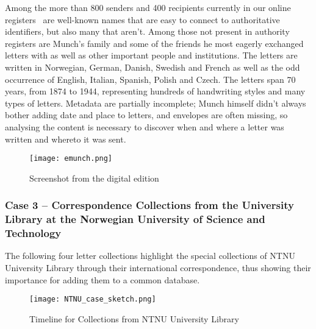 \documentclass[runningheads]{llncs}
\begin{document}
Among the more than 800 senders and 400 recipients currently in our
online registers~\cite{ref_emunch} are well-known names that
are easy to connect to authoritative identifiers, but also many that
aren't. Among those not present in authority registers are Munch's
family and some of the friends he most eagerly exchanged letters with as
well as other important people and institutions. The letters are written
in Norwegian, German, Danish, Swedish and French as well as the odd
occurrence of English, Italian, Spanish, Polish and Czech. The letters
span 70 years, from 1874 to 1944, representing hundreds of handwriting
styles and many types of letters. Metadata are partially incomplete;
Munch himself didn't always bother adding date and place to letters, and
envelopes are often missing, so analysing the content is necessary to
discover when and where a letter was written and whereto it was sent.

\begin{figure}
\texttt{[image: emunch.png]}
\caption{Screenshot from the digital edition} \label{fig5}
\end{figure}

\subsubsection{Case 3 -- Correspondence Collections from the University Library at the Norwegian University of Science and Technology}
The following four letter collections highlight the special collections
of NTNU University Library through their international correspondence,
thus showing their importance for adding them to a common database.

\begin{figure}
\texttt{[image: NTNU\_case\_sketch.png]}
\caption{Timeline for Collections from NTNU University Library} \label{fig6}
\end{figure}
\end{document}
